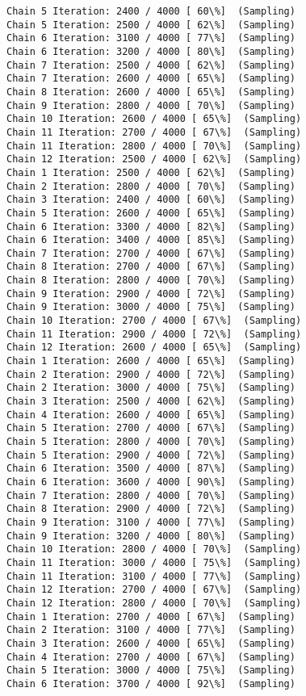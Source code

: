 \documentclass[11pt]{article}
\begin{document}
\begin{Verbatim}[commandchars=\\\{\}]
Chain 5 Iteration: 2400 / 4000 [ 60\%]  (Sampling)
Chain 5 Iteration: 2500 / 4000 [ 62\%]  (Sampling)
Chain 6 Iteration: 3100 / 4000 [ 77\%]  (Sampling)
Chain 6 Iteration: 3200 / 4000 [ 80\%]  (Sampling)
Chain 7 Iteration: 2500 / 4000 [ 62\%]  (Sampling)
Chain 7 Iteration: 2600 / 4000 [ 65\%]  (Sampling)
Chain 8 Iteration: 2600 / 4000 [ 65\%]  (Sampling)
Chain 9 Iteration: 2800 / 4000 [ 70\%]  (Sampling)
Chain 10 Iteration: 2600 / 4000 [ 65\%]  (Sampling)
Chain 11 Iteration: 2700 / 4000 [ 67\%]  (Sampling)
Chain 11 Iteration: 2800 / 4000 [ 70\%]  (Sampling)
Chain 12 Iteration: 2500 / 4000 [ 62\%]  (Sampling)
Chain 1 Iteration: 2500 / 4000 [ 62\%]  (Sampling)
Chain 2 Iteration: 2800 / 4000 [ 70\%]  (Sampling)
Chain 3 Iteration: 2400 / 4000 [ 60\%]  (Sampling)
Chain 5 Iteration: 2600 / 4000 [ 65\%]  (Sampling)
Chain 6 Iteration: 3300 / 4000 [ 82\%]  (Sampling)
Chain 6 Iteration: 3400 / 4000 [ 85\%]  (Sampling)
Chain 7 Iteration: 2700 / 4000 [ 67\%]  (Sampling)
Chain 8 Iteration: 2700 / 4000 [ 67\%]  (Sampling)
Chain 8 Iteration: 2800 / 4000 [ 70\%]  (Sampling)
Chain 9 Iteration: 2900 / 4000 [ 72\%]  (Sampling)
Chain 9 Iteration: 3000 / 4000 [ 75\%]  (Sampling)
Chain 10 Iteration: 2700 / 4000 [ 67\%]  (Sampling)
Chain 11 Iteration: 2900 / 4000 [ 72\%]  (Sampling)
Chain 12 Iteration: 2600 / 4000 [ 65\%]  (Sampling)
Chain 1 Iteration: 2600 / 4000 [ 65\%]  (Sampling)
Chain 2 Iteration: 2900 / 4000 [ 72\%]  (Sampling)
Chain 2 Iteration: 3000 / 4000 [ 75\%]  (Sampling)
Chain 3 Iteration: 2500 / 4000 [ 62\%]  (Sampling)
Chain 4 Iteration: 2600 / 4000 [ 65\%]  (Sampling)
Chain 5 Iteration: 2700 / 4000 [ 67\%]  (Sampling)
Chain 5 Iteration: 2800 / 4000 [ 70\%]  (Sampling)
Chain 5 Iteration: 2900 / 4000 [ 72\%]  (Sampling)
Chain 6 Iteration: 3500 / 4000 [ 87\%]  (Sampling)
Chain 6 Iteration: 3600 / 4000 [ 90\%]  (Sampling)
Chain 7 Iteration: 2800 / 4000 [ 70\%]  (Sampling)
Chain 8 Iteration: 2900 / 4000 [ 72\%]  (Sampling)
Chain 9 Iteration: 3100 / 4000 [ 77\%]  (Sampling)
Chain 9 Iteration: 3200 / 4000 [ 80\%]  (Sampling)
Chain 10 Iteration: 2800 / 4000 [ 70\%]  (Sampling)
Chain 11 Iteration: 3000 / 4000 [ 75\%]  (Sampling)
Chain 11 Iteration: 3100 / 4000 [ 77\%]  (Sampling)
Chain 12 Iteration: 2700 / 4000 [ 67\%]  (Sampling)
Chain 12 Iteration: 2800 / 4000 [ 70\%]  (Sampling)
Chain 1 Iteration: 2700 / 4000 [ 67\%]  (Sampling)
Chain 2 Iteration: 3100 / 4000 [ 77\%]  (Sampling)
Chain 3 Iteration: 2600 / 4000 [ 65\%]  (Sampling)
Chain 4 Iteration: 2700 / 4000 [ 67\%]  (Sampling)
Chain 5 Iteration: 3000 / 4000 [ 75\%]  (Sampling)
Chain 6 Iteration: 3700 / 4000 [ 92\%]  (Sampling)

\end{Verbatim}
\end{document}
